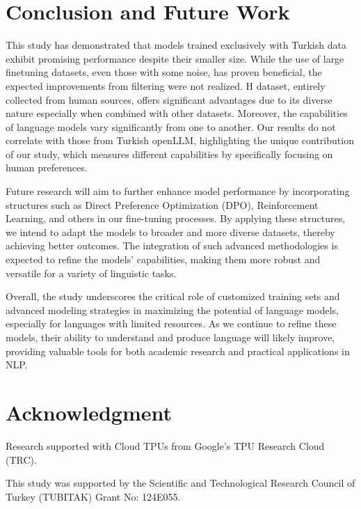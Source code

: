 \documentclass[conference]{IEEEtran}
\begin{document}
\section{Conclusion and Future Work}

This study has demonstrated that models trained exclusively with Turkish data exhibit promising performance despite their smaller size. While the use of large finetuning datasets, even those with some noise, has proven beneficial, the expected improvements from filtering were not realized. H dataset, entirely collected from human sources, offers significant advantages due to its diverse nature especially when combined with other datasets. Moreover, the capabilities of language models vary significantly from one to another. Our results do not correlate with those from Turkish openLLM\cite{OpenLLMTurkishLeaderboard2024}, highlighting the unique contribution of our study, which measures different capabilities by specifically focusing on human preferences.

Future research will aim to further enhance model performance by incorporating structures such as Direct Preference Optimization (DPO)\cite{rafailov2024direct}, Reinforcement Learning, and others in our fine-tuning processes. By applying these structures, we intend to adapt the models to broader and more diverse datasets, thereby achieving better outcomes. The integration of such advanced methodologies is expected to refine the models’ capabilities, making them more robust and versatile for a variety of linguistic tasks.

Overall, the study underscores the critical role of customized training sets and advanced modeling strategies in maximizing the potential of language models, especially for languages with limited resources. As we continue to refine these models, their ability to understand and produce language will likely improve, providing valuable tools for both academic research and practical applications in NLP.


\section*{Acknowledgment}


Research supported with Cloud TPUs from Google's TPU Research Cloud (TRC).

This study was supported by the Scientific and Technological Research Council of Turkey (TUBITAK) Grant No: 124E055.

\end{document}
